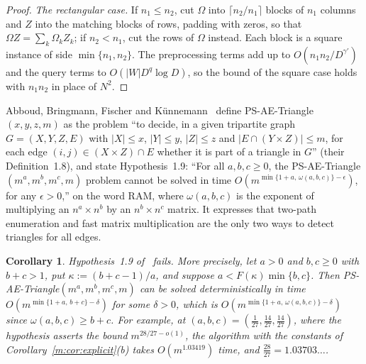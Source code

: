 \documentclass[11pt]{article}
\newtheorem{corollary}[theorem]{Corollary}
\theoremstyle{definition}
\theoremstyle{remark}
\newcommand{\ABFKexampleExp}{1.03419}%
\begin{document}
\begin{proof}
\emph{The rectangular case.} If $n_1\le n_2$, cut $\Omega$ into $\lceil n_2/n_1\rceil$ blocks of $n_1$ columns and $Z$ into the matching blocks of rows, padding with zeros, so that $\Omega Z=\sum_k\Omega_kZ_k$; if $n_2<n_1$, cut the rows of $\Omega$ instead. Each block is a square instance of side $\min\{n_1,n_2\}$. The preprocessing terms add up to $O(n_1n_2/D^{\gamma'})$ and the query terms to $O(|W|D^q\log D)$, so the bound of the square case holds with $n_1n_2$ in place of $N^2$.
\end{proof}

Abboud, Bringmann, Fischer and K\"unnemann~\cite{ABFK24} define PS-AE-Triangle$(x,y,z,m)$ as the problem ``to decide, in a given tripartite graph $G=(X,Y,Z,E)$ with $|X|\le x$, $|Y|\le y$, $|Z|\le z$ and $|E\cap(Y\times Z)|\le m$, for each edge $(i,j)\in(X\times Z)\cap E$ whether it is part of a triangle in $G$'' (their Definition~1.8), and state Hypothesis~1.9: ``For all $a,b,c\ge0$, the PS-AE-Triangle$(m^a,m^b,m^c,m)$ problem cannot be solved in time $O(m^{\min\{1+a,\,\omega(a,b,c)\}-\epsilon})$, for any $\epsilon>0$,'' on the word RAM, where $\omega(a,b,c)$ is the exponent of multiplying an $n^a\times n^b$ by an $n^b\times n^c$ matrix. It expresses that two-path enumeration and fast matrix multiplication are the only two ways to detect triangles for all edges.

\begin{corollary}\label{m:cor:abfk}
Hypothesis~1.9 of~\cite{ABFK24} fails. More precisely, let $a>0$ and $b,c\ge0$ with $b+c>1$, put $\kappa:=(b+c-1)/a$, and suppose $a<F(\kappa)\min\{b,c\}$. Then PS-AE-Triangle$(m^a,m^b,m^c,m)$ can be solved deterministically in time $O(m^{\min\{1+a,\,b+c\}-\delta})$ for some $\delta>0$, which is $O(m^{\min\{1+a,\,\omega(a,b,c)\}-\delta})$ since $\omega(a,b,c)\ge b+c$. For example, at $(a,b,c)=(\frac1{27},\frac{14}{27},\frac{14}{27})$, where the hypothesis asserts the bound $m^{28/27-o(1)}$, the algorithm with the constants of Corollary~\ref{m:cor:explicit}(b) takes $O(m^{\ABFKexampleExp})$ time, and $\frac{28}{27}=1.03703\ldots$.
\end{corollary}
\end{document}
